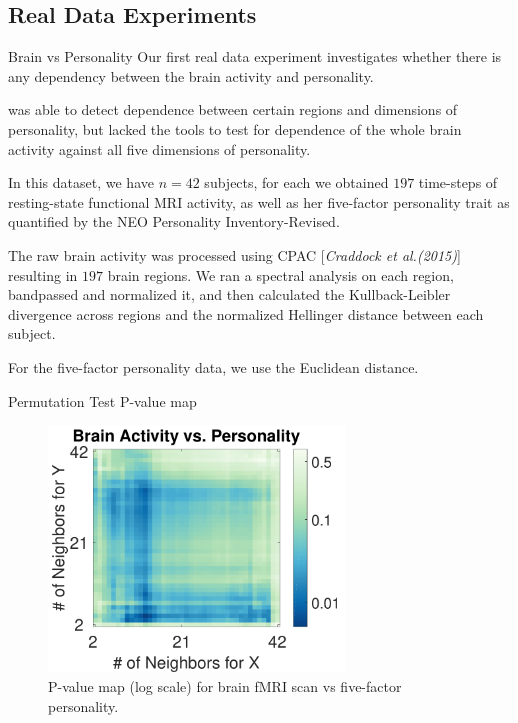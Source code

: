 \documentclass{beamer}
\begin{document}
\subsection{Real Data Experiments}
\begin{frame}{Brain vs Personality}
Our first real data experiment investigates whether there is any dependency between the brain activity and personality.

\pause
{} \cite{AdelsteinEtAl2011} was able to detect dependence between certain regions and dimensions of personality, but lacked the tools to test for dependence of the whole brain activity against all five dimensions of personality. 

\pause
\medskip 
In this dataset, we have $n=42$ subjects, for each we obtained  $197$ time-steps of resting-state functional MRI activity, as well as her five-factor personality trait as quantified by  the NEO Personality Inventory-Revised. 

\pause
\medskip 
The raw brain activity was processed using CPAC [\textit{Craddock et al.(2015)}]\cite{CPAC2015} resulting in $197$ brain regions. We ran a spectral analysis on each region, bandpassed and normalized it, and then calculated the Kullback-Leibler divergence across regions and the normalized Hellinger distance between each subject.  

\pause
\medskip 
For the five-factor personality data, we  use the Euclidean distance.
\end{frame}

\begin{frame}{Permutation Test P-value map}
\begin{figure}[htbp]
\includegraphics[width=0.7\textwidth]{../Figures/FigReal1}
\caption{P-value map (log scale) for brain fMRI scan vs five-factor personality.}
\label{f:realA}
\end{figure}
\end{frame}
\end{document}
